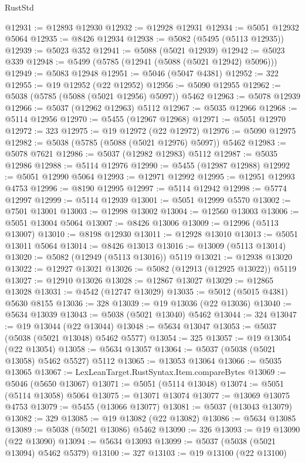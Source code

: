 \begin{lexlean}{RustStd}
\begin{coremodule}
@12931 := @12893 @12930
@12932 := @12928 @12931
@12934 := @5051 @12932 @5064
@12935 := @8426 @12934
@12938 := @5082 (@5495 (@5113 @12935))
@12939 := @5023 @352
@12941 := @5088 (@5021 @12939)
@12942 := @5023 @339
@12948 := @5499 (@5785 (@12941 (@5088 (@5021 @12942) @5096)))
@12949 := @5083 @12948
@12951 := @5046 (@5047 @4381)
@12952 := 322
@12955 := @19 @12952 (@22 @12952)
@12956 := @5090 @12955
@12962 := @5038 (@5785 (@5088 (@5021 @12956) @5097)) @5462
@12963 := @5078 @12939
@12966 := @5037 (@12962 @12963) @5112
@12967 := @5035 @12966
@12968 := @5114 @12956
@12970 := @5455 (@12967 @12968)
@12971 := @5051 @12970
@12972 := 323
@12975 := @19 @12972 (@22 @12972)
@12976 := @5090 @12975
@12982 := @5038 (@5785 (@5088 (@5021 @12976) @5097)) @5462
@12983 := @5078 @7621
@12986 := @5037 (@12982 @12983) @5112
@12987 := @5035 @12986
@12988 := @5114 @12976
@12990 := @5455 (@12987 @12988)
@12992 := @5051 @12990 @5064
@12993 := @12971 @12992
@12995 := @12951 @12993 @4753
@12996 := @8190 @12995
@12997 := @5114 @12942
@12998 := @5774 @12997
@12999 := @5114 @12939
@13001 := @5051 @12999 @5570
@13002 := @7501 @13001
@13003 := @12998 @13002
@13004 := @12560 @13003
@13006 := @5051 @13004 @5064
@13007 := @8426 @13006
@13009 := @12996 (@5113 @13007)
@13010 := @8198 @12930
@13011 := @12928 @13010
@13013 := @5051 @13011 @5064
@13014 := @8426 @13013
@13016 := @13009 (@5113 @13014)
@13020 := @5082 (@12949 (@5113 @13016)) @5119
@13021 := @12938 @13020
@13022 := @12927 @13021
@13026 := @5082 (@12913 (@12925 @13022)) @5119
@13027 := @12910 @13026
@13028 := @12867 @13027
@13029 := @12865 @13028
@13031 := @4542 (@12747 @13029)
@13035 := @5012 (@5015 @4381) @5630 @8155
@13036 := 328
@13039 := @19 @13036 (@22 @13036)
@13040 := @5634 @13039
@13043 := @5038 (@5021 @13040) @5462
@13044 := 324
@13047 := @19 @13044 (@22 @13044)
@13048 := @5634 @13047
@13053 := @5037 (@5038 (@5021 @13048) @5462 @5577)
@13054 := 325
@13057 := @19 @13054 (@22 @13054)
@13058 := @5634 @13057
@13064 := @5037 (@5038 (@5021 @13058) @5462 @5527) @5112
@13065 := @13053 @13064
@13066 := @5035 @13065
@13067 := LexLeanTarget.RustSyntax.Item.compareBytes
@13069 := @5046 (@5650 @13067)
@13071 := @5051 (@5114 @13048)
@13074 := @5051 (@5114 @13058) @5064
@13075 := @13071 @13074
@13077 := @13069 @13075 @4753
@13079 := @5455 (@13066 @13077)
@13081 := @5037 (@13043 @13079)
@13082 := 329
@13085 := @19 @13082 (@22 @13082)
@13086 := @5634 @13085
@13089 := @5038 (@5021 @13086) @5462
@13090 := 326
@13093 := @19 @13090 (@22 @13090)
@13094 := @5634 @13093
@13099 := @5037 (@5038 (@5021 @13094) @5462 @5379)
@13100 := 327
@13103 := @19 @13100 (@22 @13100)

\end{coremodule}
\end{lexlean}

